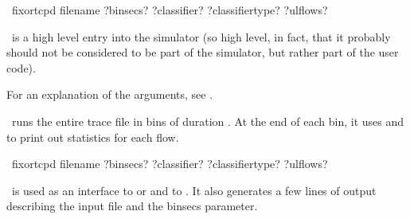 \documentclass{article}
\begin{document}
\manend


\SYNOPSIS \cmdname\ fixortcpd filename ?binsecs? ?classifier?
?classifiertype? ?ulflows?

\cmdname\ is a high level entry into the simulator (so high level, in
fact, that it probably should not be considered to be part of the
simulator, but rather part of the user code).

For an explanation of the arguments, see .

\cmdname\ runs the entire trace file in bins of duration
.  At the end of each bin, it uses
 and  to
print out statistics for each flow.

\SEEALSO


\manend


\SYNOPSIS \cmdname\ fixortcpd filename ?binsecs? ?classifier?
?classifiertype? ?ulflows?

\cmdname\ is used as an interface to  or
 and to .  It also generates
a few lines of output describing the input file and the binsecs
parameter.
\end{document}
